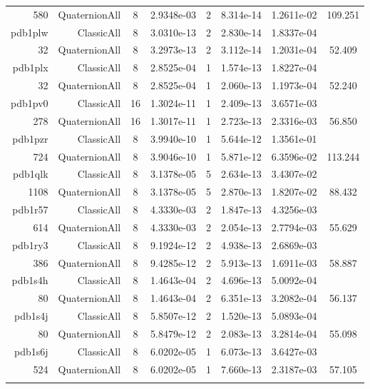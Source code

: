 \begin{xltabular}{\textwidth}{r|rcS[table-format=1.4e+2]cS[table-format=1.3e+2]S[table-format=1.4e+2]S[table-format=-1.3]}
580 & QuaternionAll & 8 & 2.9348e-03 & 2 & 8.314e-14 & 1.2611e-02 & 109.251\\  \addlinespace
pdb1plw & ClassicAll & 8 & 3.0310e-13 & 2 & 2.830e-14 & 1.8337e-04 & \\
32 & QuaternionAll & 8 & 3.2973e-13 & 2 & 3.112e-14 & 1.2031e-04 & 52.409\\  \addlinespace
pdb1plx & ClassicAll & 8 & 2.8525e-04 & 1 & 1.574e-13 & 1.8227e-04 & \\
32 & QuaternionAll & 8 & 2.8525e-04 & 1 & 2.060e-13 & 1.1973e-04 & 52.240\\  \addlinespace
pdb1pv0 & ClassicAll & 16 & 1.3024e-11 & 1 & 2.409e-13 & 3.6571e-03 & \\
278 & QuaternionAll & 16 & 1.3017e-11 & 1 & 2.723e-13 & 2.3316e-03 & 56.850\\  \addlinespace
pdb1pzr & ClassicAll & 8 & 3.9940e-10 & 1 & 5.644e-12 & 1.3561e-01 & \\
724 & QuaternionAll & 8 & 3.9046e-10 & 1 & 5.871e-12 & 6.3596e-02 & 113.244\\  \addlinespace
pdb1qlk & ClassicAll & 8 & 3.1378e-05 & 5 & 2.634e-13 & 3.4307e-02 & \\
1108 & QuaternionAll & 8 & 3.1378e-05 & 5 & 2.870e-13 & 1.8207e-02 & 88.432\\  \addlinespace
pdb1r57 & ClassicAll & 8 & 4.3330e-03 & 2 & 1.847e-13 & 4.3256e-03 & \\
614 & QuaternionAll & 8 & 4.3330e-03 & 2 & 2.054e-13 & 2.7794e-03 & 55.629\\  \addlinespace
pdb1ry3 & ClassicAll & 8 & 9.1924e-12 & 2 & 4.938e-13 & 2.6869e-03 & \\
386 & QuaternionAll & 8 & 9.4285e-12 & 2 & 5.913e-13 & 1.6911e-03 & 58.887\\  \addlinespace
pdb1s4h & ClassicAll & 8 & 1.4643e-04 & 2 & 4.696e-13 & 5.0092e-04 & \\
80 & QuaternionAll & 8 & 1.4643e-04 & 2 & 6.351e-13 & 3.2082e-04 & 56.137\\  \addlinespace
pdb1s4j & ClassicAll & 8 & 5.8507e-12 & 2 & 1.520e-13 & 5.0893e-04 & \\
80 & QuaternionAll & 8 & 5.8479e-12 & 2 & 2.083e-13 & 3.2814e-04 & 55.098\\  \addlinespace
pdb1s6j & ClassicAll & 8 & 6.0202e-05 & 1 & 6.073e-13 & 3.6427e-03 & \\
524 & QuaternionAll & 8 & 6.0202e-05 & 1 & 7.660e-13 & 2.3187e-03 & 57.105\\  \addlinespace

\end{xltabular}

